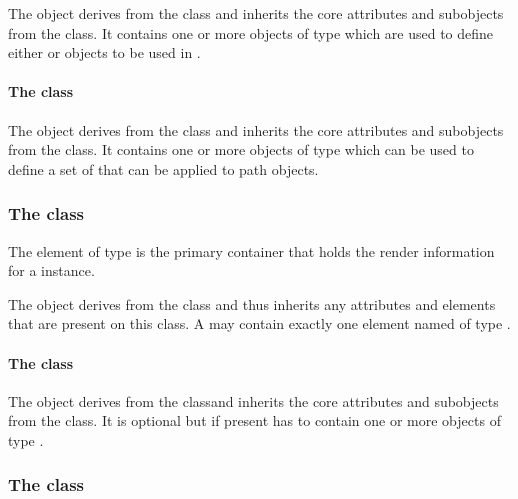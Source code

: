 The \ListOfGradientDefinitions object derives from the  class
and inherits the core attributes and subobjects from the 
class. It contains one or more objects of type \GradientBase which are used to define either \LinearGradient or \RadialGradient objects to be used in \Styles. 

\paragraph{The  class}
\label{listoflineendings-class}

The \ListOfLineEndings object derives from the  class and
inherits the core attributes and subobjects from the 
class. It contains one or more objects of type \LineEnding which can be used to define a set of \LineEndings that can be applied to path objects.


\subsubsection{The  class}
\label{localrenderinformation-class}
The \RenderInformation element of type \LocalRenderInformation is the primary 
container that holds the render information for a  instance. 


The \LocalRenderInformation object derives from the
\RenderInformationBase class and thus inherits any attributes and
elements that are present on this class.
A \LocalRenderInformation may contain exactly one element named  
of type \ListOfLocalStyles.

\paragraph{The  class}
\label{listoflocalstyles-class}

The \ListOfLocalStyles object derives from the  classand inherits
the core attributes and subobjects from the  class. It is optional but 
if present has to contain one or more objects of type \LocalStyle.


\subsubsection{The  class}
\label{globalrenderinformation-class}

